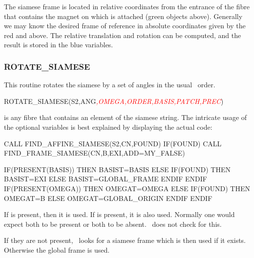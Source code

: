 
The siamese frame is located in relative coordinates from the entrance
of the fibre that contains the magnet on which  is
attached (green objects above). Generally we may know the desired
frame of reference in absolute coordinates given by the red 
and  above. The relative translation and rotation can be
computed, and the result is stored in the blue variables.


\subsubsection*{ROTATE\_SIAMESE}

%
This routine rotates the siamese by a set of angles  in the
usual \PTC\ order.

\begin{ptccode}
ROTATE_SIAMESE(S2,ANG\textit{\textcolor{red}{,OMEGA,ORDER,BASIS,PATCH,PREC}})
\end{ptccode}

 is any fibre that contains an element of the siamese string. The
intricate usage of the optional variables  is
best explained by displaying the actual code:

\begin{ptccode}
CALL FIND_AFFINE_SIAMESE(S2,CN,FOUND)
IF(FOUND) CALL FIND_FRAME_SIAMESE(CN,B,EXI,ADD=MY_FALSE)

IF(PRESENT(BASIS)) THEN
  BASIST=BASIS
ELSE
  IF(FOUND) THEN
    BASIST=EXI
  ELSE
    BASIST=GLOBAL_FRAME
  ENDIF
ENDIF
IF(PRESENT(OMEGA)) THEN
  OMEGAT=OMEGA
ELSE
  IF(FOUND) THEN
    OMEGAT=B
  ELSE
    OMEGAT=GLOBAL_ORIGIN
  ENDIF
ENDIF
\end{ptccode}

If  is present, then it is used. If  is present, it is also
used. Normally one would expect both to be present or both to be absent.
\PTC\ does not check for this.

If they are not present, \PTC\ looks for a siamese frame which is then
used if it exists. Otherwise the global frame is used.

